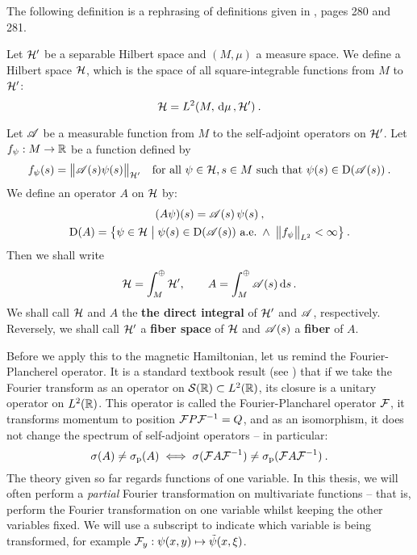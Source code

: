 The following definition is a rephrasing of definitions given in \cite{ReedSimon4}, pages 280 and 281.
\begin{defn}
    \label{defn-direct-integral}
    Let $\mathcal{H}'$ be a separable Hilbert space and $(M, \mu)$ a measure space. We define a Hilbert space $\mathcal{H}$, which is the space of all square-integrable functions from $M$ to $\mathcal{H}'$:
    \begin{equation*}
        \mathcal{H} = L^2(M, \, \mathrm{d}\mu \,, \mathcal{H}') \: .
    \end{equation*}

    Let $\mathscr{A}$ be a measurable function from $M$ to the self-adjoint operators on $\mathcal{H}'$. Let $f_\psi: M \to \mathbb{R}$ be a function defined by
    \begin{align*}
        f_\psi(s) = \big\lVert \mathscr{A}(s) \psi(s) \big\rVert_{\mathcal{H}'}
        \quad
        \text{for all } \psi \in \mathcal{H}, s \in M \text{ such that } \psi(s) \in \mathrm{D}(\mathscr{A}(s)) \: .
    \end{align*}
    We define an operator $A$ on $\mathcal{H}$ by:
    \begin{gather*}
        (A \psi)(s) = \mathscr{A}(s) \, \psi(s) \: , \\
        \mathrm{D}(A) = \big\{
            \psi \in \mathcal{H}
            \; \big| \;
            \psi(s) \in \mathrm{D}(\mathscr{A}(s)) \text{ a.e.}
            \; \wedge \;
            \big\lVert f_\psi \big\rVert_{L^2} < \infty
        \big\} \: .
    \end{gather*}
    Then we shall write
    \begin{gather*}
        \mathcal{H} = \int^\oplus_M \mathcal{H}', \qquad
        A = \int^\oplus_M \mathscr{A}(s) \, \mathrm{d}s \,.
    \end{gather*}
    We shall call $\mathcal{H}$ and $A$ the \textbf{the direct integral} of $\mathcal{H}'$ and $\mathscr{A}$, respectively. Reversely, we shall call $\mathcal{H}'$ a \textbf{fiber space} of $\mathcal{H}$ and $\mathscr{A}(s)$ a \textbf{fiber} of $A$.
\end{defn}

Before we apply this to the magnetic Hamiltonian, let us remind the Fourier-Plancherel operator. It is a standard textbook result (see \cite{BEH}) that if we take the Fourier transform as an operator on $\mathcal{S}(\mathbb{R}) \subset L^2(\mathbb{R})$, its closure is a unitary operator on $L^2(\mathbb{R})$. This operator is called the Fourier-Plancharel operator $\mathcal{F}$, it transforms momentum to position $\mathcal{F} P \mathcal{F}^{-1} = Q$, and as an isomorphism, it does not change the spectrum of self-adjoint operators – in particular:
\begin{equation*}
    \sigma(A) \neq \sigma_{\mathrm{p}}(A)
    \;\Longleftrightarrow\;
    \sigma(\mathcal{F} A \mathcal{F}^{-1}) \neq \sigma_{\mathrm{p}}(\mathcal{F} A \mathcal{F}^{-1})
    \: .
\end{equation*}
The theory given so far regards functions of one variable. In this thesis, we will often perform a \textit{partial} Fourier transformation on multivariate functions – that is, perform the Fourier transformation on one variable whilst keeping the other variables fixed. We will use a subscript to indicate which variable is being transformed, for example $\mathcal{F}_y: \psi(x,y) \mapsto \tilde\psi(x,\xi)$.

